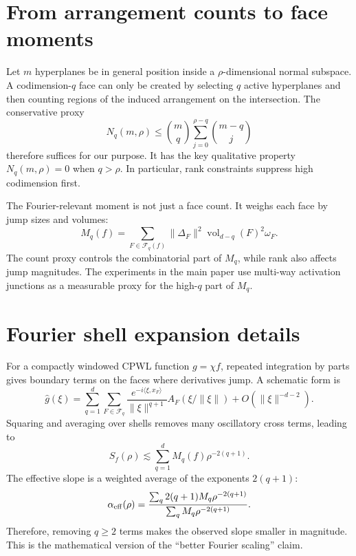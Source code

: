 \documentclass[10pt]{article}
\newcommand{\wh}{\widehat}
\newcommand{\cF}{\mathcal{F}}
\begin{document}
\section{From arrangement counts to face moments}
Let $m$ hyperplanes be in general position inside a $\rho$-dimensional normal subspace.  A codimension-$q$ face can only be created by selecting $q$ active hyperplanes and then counting regions of the induced arrangement on the intersection.  The conservative proxy
\begin{equation}
N_q(m,\rho)\le {m\choose q}\sum_{j=0}^{\rho-q}{m-q\choose j}
\end{equation}
therefore suffices for our purpose.  It has the key qualitative property $N_q(m,\rho)=0$ when $q>\rho$.  In particular, rank constraints suppress high codimension first.

The Fourier-relevant moment is not just a face count.  It weighs each face by jump sizes and volumes:
\begin{equation}
M_q(f)=\sum_{F\in\cF_q(f)}\|\Delta_F\|^2\operatorname{vol}_{d-q}(F)^2\omega_F.
\end{equation}
The count proxy controls the combinatorial part of $M_q$, while rank also affects jump magnitudes.  The experiments in the main paper use multi-way activation junctions as a measurable proxy for the high-$q$ part of $M_q$.

\section{Fourier shell expansion details}
For a compactly windowed CPWL function $g=\chi f$, repeated integration by parts gives boundary terms on the faces where derivatives jump.  A schematic form is
\begin{equation}
\wh g(\xi)=\sum_{q=1}^{d}\sum_{F\in\cF_q} \frac{e^{-i\langle \xi,x_F\rangle}}{\|\xi\|^{q+1}}A_F(\xi/\|\xi\|)+O(\|\xi\|^{-d-2}).
\end{equation}
Squaring and averaging over shells removes many oscillatory cross terms, leading to
\begin{equation}
S_f(\rho)\lesssim \sum_{q=1}^{d}M_q(f)\rho^{-2(q+1)}.
\end{equation}
The effective slope is a weighted average of the exponents $2(q+1)$:
\begin{equation}
\alpha_{\rm eff}(\rho)=\frac{\sum_q2(q+1)M_q\rho^{-2(q+1)}}{\sum_qM_q\rho^{-2(q+1)}}.
\end{equation}
Therefore, removing $q\ge2$ terms makes the observed slope smaller in magnitude.  This is the mathematical version of the ``better Fourier scaling'' claim.
\end{document}
